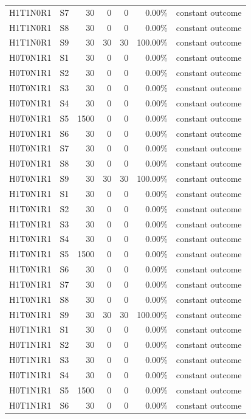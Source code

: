 \begin{tabular}{llrrrrl}
H1T1N0R1 & S7 & 30 & 0 & 0 & 0.00\% & constant outcome \\
H1T1N0R1 & S8 & 30 & 0 & 0 & 0.00\% & constant outcome \\
H1T1N0R1 & S9 & 30 & 30 & 30 & 100.00\% & constant outcome \\
H0T0N1R1 & S1 & 30 & 0 & 0 & 0.00\% & constant outcome \\
H0T0N1R1 & S2 & 30 & 0 & 0 & 0.00\% & constant outcome \\
H0T0N1R1 & S3 & 30 & 0 & 0 & 0.00\% & constant outcome \\
H0T0N1R1 & S4 & 30 & 0 & 0 & 0.00\% & constant outcome \\
H0T0N1R1 & S5 & 1500 & 0 & 0 & 0.00\% & constant outcome \\
H0T0N1R1 & S6 & 30 & 0 & 0 & 0.00\% & constant outcome \\
H0T0N1R1 & S7 & 30 & 0 & 0 & 0.00\% & constant outcome \\
H0T0N1R1 & S8 & 30 & 0 & 0 & 0.00\% & constant outcome \\
H0T0N1R1 & S9 & 30 & 30 & 30 & 100.00\% & constant outcome \\
H1T0N1R1 & S1 & 30 & 0 & 0 & 0.00\% & constant outcome \\
H1T0N1R1 & S2 & 30 & 0 & 0 & 0.00\% & constant outcome \\
H1T0N1R1 & S3 & 30 & 0 & 0 & 0.00\% & constant outcome \\
H1T0N1R1 & S4 & 30 & 0 & 0 & 0.00\% & constant outcome \\
H1T0N1R1 & S5 & 1500 & 0 & 0 & 0.00\% & constant outcome \\
H1T0N1R1 & S6 & 30 & 0 & 0 & 0.00\% & constant outcome \\
H1T0N1R1 & S7 & 30 & 0 & 0 & 0.00\% & constant outcome \\
H1T0N1R1 & S8 & 30 & 0 & 0 & 0.00\% & constant outcome \\
H1T0N1R1 & S9 & 30 & 30 & 30 & 100.00\% & constant outcome \\
H0T1N1R1 & S1 & 30 & 0 & 0 & 0.00\% & constant outcome \\
H0T1N1R1 & S2 & 30 & 0 & 0 & 0.00\% & constant outcome \\
H0T1N1R1 & S3 & 30 & 0 & 0 & 0.00\% & constant outcome \\
H0T1N1R1 & S4 & 30 & 0 & 0 & 0.00\% & constant outcome \\
H0T1N1R1 & S5 & 1500 & 0 & 0 & 0.00\% & constant outcome \\
H0T1N1R1 & S6 & 30 & 0 & 0 & 0.00\% & constant outcome \\

\end{tabular}
